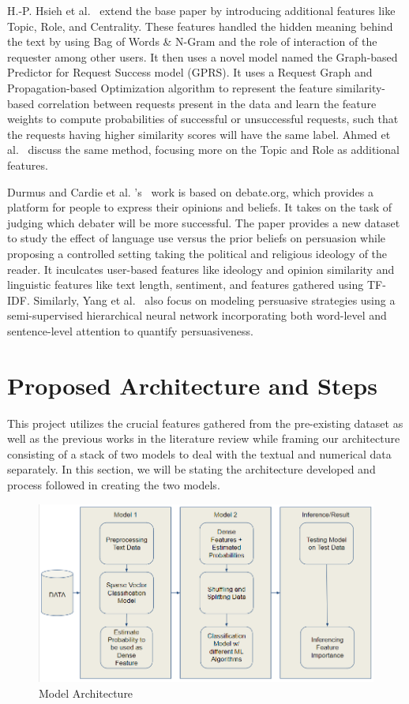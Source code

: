 \documentclass[conference]{IEEEtran}
\begin{document}
H.-P. Hsieh et al.~\cite{raop_gprs} extend the base paper by introducing additional features like Topic, Role, and Centrality. These features handled the hidden meaning behind the text by using Bag of Words \& N-Gram and the role of interaction of the requester among other users. It then uses a novel model named the Graph-based Predictor for Request Success model (GPRS). It uses a Request Graph and Propagation-based Optimization algorithm to represent the feature similarity-based correlation between requests present in the data and learn the feature weights to compute probabilities of successful or unsuccessful requests, such that the requests having higher similarity scores will have the same label. Ahmed et al.~\cite{raop_gprs2} discuss the same method, focusing more on the Topic and Role as additional features.

Durmus and Cardie et al. 's~\cite{debate} work is based on debate.org, which provides a platform for people to express their opinions and beliefs. It takes on the task of judging which debater will be more successful. The paper provides a new dataset to study the effect of language use versus the prior beliefs on persuasion while proposing a controlled setting taking the political and religious ideology of the reader. It inculcates user-based features like ideology and opinion similarity and linguistic features like text length, sentiment, and features gathered using TF-IDF. Similarly, Yang et al.~\cite{neural_req1,neural_req2} also focus on modeling persuasive strategies using a semi-supervised hierarchical neural network incorporating both word-level and sentence-level attention to quantify persuasiveness.

\section{Proposed Architecture and Steps}
This project utilizes the crucial features gathered from the pre-existing dataset as well as the previous works in the literature review while framing our architecture consisting of a stack of two models to deal with the textual and numerical data separately. In this section, we will be stating the architecture developed and process followed in creating the two models.

\begin{figure}
\centering
\includegraphics[width=\linewidth]{arch_diag.png}
\caption{Model Architecture} \label{fig1}
\end{figure}
\end{document}
